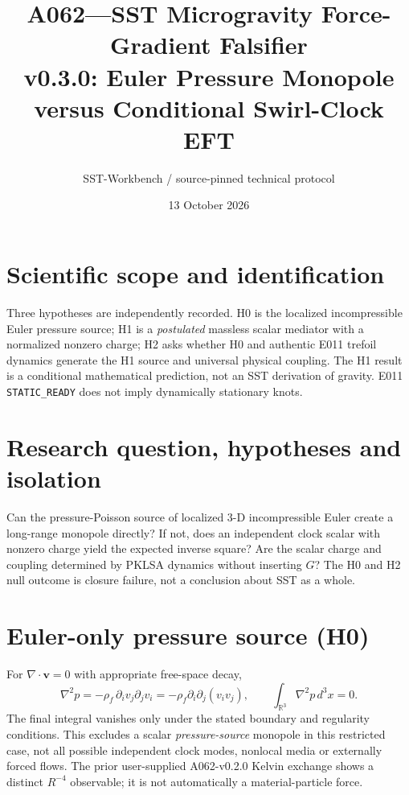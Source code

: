 \documentclass[10pt,a4paper]{article}
\title{A062---SST Microgravity Force-Gradient Falsifier\\\large v0.3.0: Euler Pressure Monopole versus Conditional Swirl-Clock EFT}
\author{SST-Workbench / source-pinned technical protocol}
\date{13 October 2026}
\begin{document}
\maketitle
\section{Scientific scope and identification}
Three hypotheses are independently recorded. H0 is the localized incompressible Euler pressure source; H1 is a \emph{postulated} massless scalar mediator with a normalized nonzero charge; H2 asks whether H0 and authentic E011 trefoil dynamics generate the H1 source and universal physical coupling. The H1 result is a conditional mathematical prediction, not an SST derivation of gravity. E011 \texttt{STATIC\_READY} does not imply dynamically stationary knots.
\section{Research question, hypotheses and isolation}
Can the pressure-Poisson source of localized 3-D incompressible Euler create a long-range monopole directly? If not, does an independent clock scalar with nonzero charge yield the expected inverse square? Are the scalar charge and coupling determined by PKLSA dynamics without inserting $G$? The H0 and H2 null outcome is closure failure, not a conclusion about SST as a whole.
\section{Euler-only pressure source (H0)}
For $\nabla\cdot\mathbf v=0$ with appropriate free-space decay,
\begin{equation}
\nabla^2p=-\rho_f\,\partial_i v_j\partial_j v_i=-\rho_f\partial_i\partial_j(v_i v_j), \qquad \int_{\mathbb R^3}\nabla^2p\,d^3x=0.
\end{equation}
The final integral vanishes only under the stated boundary and regularity conditions. This excludes a scalar \emph{pressure-source} monopole in this restricted case, not all possible independent clock modes, nonlocal media or externally forced flows. The prior user-supplied A062-v0.2.0 Kelvin exchange shows a distinct $R^{-4}$ observable; it is not automatically a material-particle force.
\end{document}
